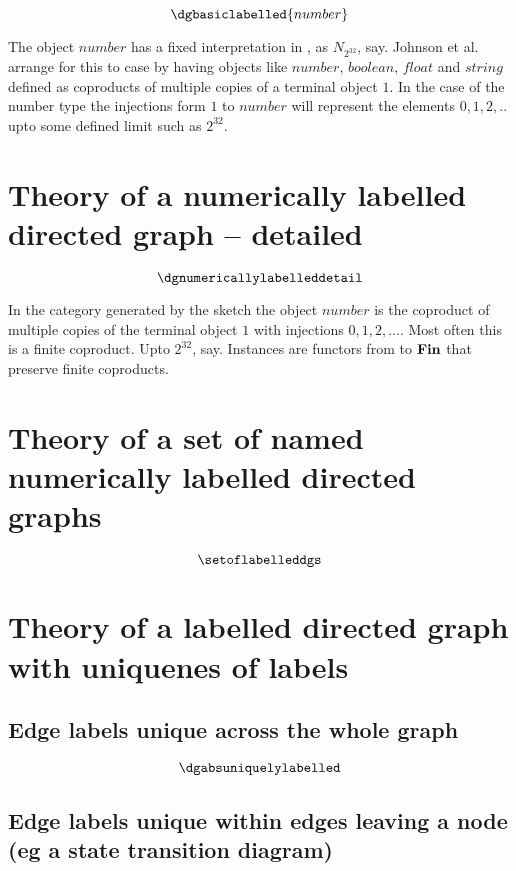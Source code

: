 \documentclass[10pt,a4paper]{article}
\theoremstyle{remark}
\begin{document}
\begin{displaymath}
\dgbasiclabelled{number}
\end{displaymath}

The object $number$ has a fixed interpretation in \Fin, as $N_{2^{32}}$, say.
Johnson et al. arrange for this to case by having objects like $number$, $boolean$, $float$
and $string$  defined as coproducts of multiple copies of a terminal object $1$. 
In the case of the number type the injections form $1$ to $number$ will represent
the elements $0,1,2,..$ upto some defined limit such as $2^{32}$. 

\section*{Theory of a numerically labelled directed graph -- detailed}

\begin{displaymath}
\dgnumericallylabelleddetail
\end{displaymath}

In the category \catcw generated by the sketch the object $number$ is the coproduct
of multiple copies of the terminal object $1$ with injections $0,1,2,...$.
Most often this is a finite coproduct. Upto $2^32$, say.
Instances are functors from \catcw to $\textbf{Fin}$ that preserve finite coproducts.

\section*{Theory of a set of named numerically labelled directed graphs}

\begin{displaymath}
\setoflabelleddgs
\end{displaymath}

\section*{Theory of a labelled directed graph with uniquenes of labels }
\subsection*{Edge labels unique across the whole graph}
\begin{displaymath}
\dgabsuniquelylabelled
\end{displaymath}

\subsection*{Edge labels unique within edges leaving a node (eg a state transition diagram)}
\end{document}
